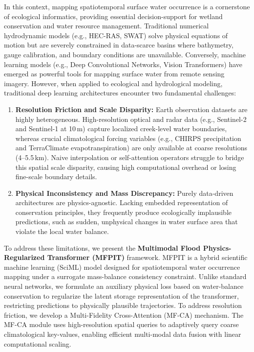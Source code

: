 \documentclass[journal]{IEEEtran}
\begin{document}
In this context, mapping spatiotemporal surface water occurrence is a cornerstone of ecological informatics, providing essential decision-support for wetland conservation and water resource management. Traditional numerical hydrodynamic models (e.g., HEC-RAS, SWAT) solve physical equations of motion but are severely constrained in data-scarce basins where bathymetry, gauge calibration, and boundary conditions are unavailable. Conversely, machine learning models (e.g., Deep Convolutional Networks, Vision Transformers) have emerged as powerful tools for mapping surface water from remote sensing imagery. However, when applied to ecological and hydrological modeling, traditional deep learning architectures encounter two fundamental challenges:
\begin{enumerate}
    \item \textbf{Resolution Friction and Scale Disparity:} Earth observation datasets are highly heterogeneous. High-resolution optical and radar data (e.g., Sentinel-2 and Sentinel-1 at 10\,m) capture localized creek-level water boundaries, whereas crucial climatological forcing variables (e.g., CHIRPS precipitation and TerraClimate evapotranspiration) are only available at coarse resolutions (4--5.5\,km). Naive interpolation or self-attention operators struggle to bridge this spatial scale disparity, causing high computational overhead or losing fine-scale boundary details.
    \item \textbf{Physical Inconsistency and Mass Discrepancy:} Purely data-driven architectures are physics-agnostic. Lacking embedded representation of conservation principles, they frequently produce ecologically implausible predictions, such as sudden, unphysical changes in water surface area that violate the local water balance.
\end{enumerate}

To address these limitations, we present the \textbf{Multimodal Flood Physics-Regularized Transformer (MFPIT)} framework. MFPIT is a hybrid scientific machine learning (SciML) model designed for spatiotemporal water occurrence mapping under a surrogate mass-balance consistency constraint. Unlike standard neural networks, we formulate an auxiliary physical loss based on water-balance conservation to regularize the latent storage representation of the transformer, restricting predictions to physically plausible trajectories. To address resolution friction, we develop a Multi-Fidelity Cross-Attention (MF-CA) mechanism. The MF-CA module uses high-resolution spatial queries to adaptively query coarse climatological key-values, enabling efficient multi-modal data fusion with linear computational scaling.
\end{document}
